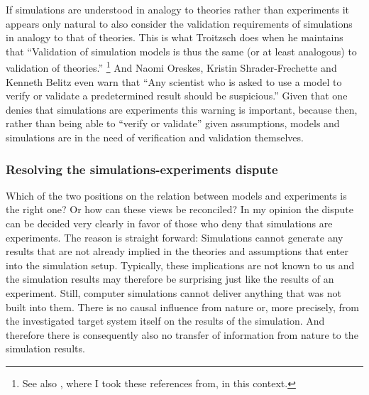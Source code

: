\documentclass[onecollarge]{STJour}
\numberwithin{equation}{section}
\begin{document}
If simulations are understood in analogy to theories rather than
experiments it appears only natural to also consider the validation
requirements of simulations in analogy to that of theories. This is what
Troitzsch does when he maintains that ``Validation of simulation models
is thus the same (or at least analogous) to validation of theories.''
\citep{troitzsch:2004}\footnote{See also \citet{k_uuml_ppers2005}, where
I took these references from, in this context.} And Naomi Oreskes,
Kristin Shrader-Frechette and Kenneth Belitz even warn that ``Any
scientist who is asked to use a model to verify or validate a
predetermined result should be suspicious.'' \citep[p.\
644]{oreskes-et-al:1994} Given that one denies that simulations are
experiments this warning is important, because then, rather than being
able to ``verify or validate'' given assumptions, models and simulations
are in the need of verification and validation themselves.

% 
% 
% 
% 


\subsubsection{Resolving the simulations-experiments dispute}

Which of the two positions on the relation between models and experiments
is the right one? Or how can these views be reconciled? In my opinion the
dispute can be decided very clearly in favor of those who deny that
simulations are experiments. The reason is straight forward: Simulations
cannot generate any results that are not already implied in the theories
and assumptions that enter into the simulation setup. Typically, these
implications are not known to us and the simulation results may
therefore be surprising just like the results of an experiment. 
Still, computer simulations cannot deliver anything that was not built
into them. There is no causal influence from nature or, more precisely,
from the investigated target system itself on the results of the
simulation. And therefore there is consequently also no transfer of
information from nature to the simulation results.
\end{document}
